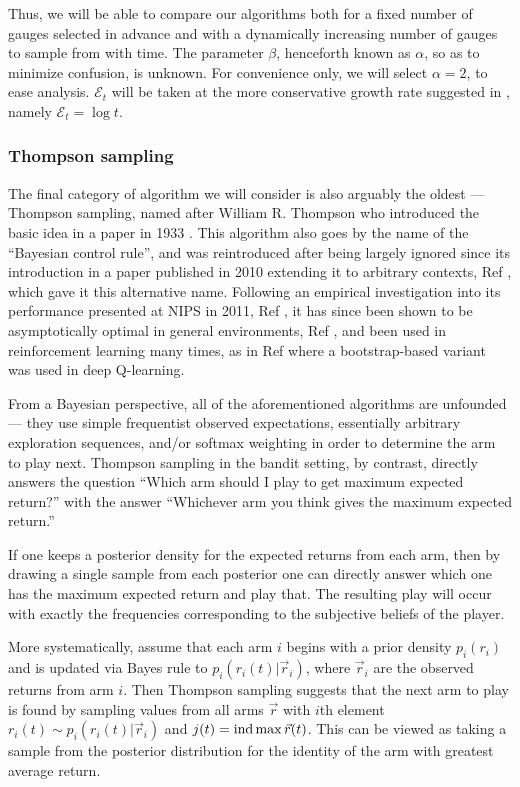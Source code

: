 Thus, we will be able to compare our algorithms both for a fixed number of gauges selected in advance and with a dynamically increasing number of gauges to sample from with time. The parameter $\beta$, henceforth known as $\alpha$, so as to minimize confusion, is unknown. For convenience only, we will select $\alpha=2$, to ease analysis. $\mathcal{E}_t$ will be taken at the more conservative growth rate suggested in \cite{infinitebandits}, namely $\mathcal{E}_t=\log{t}$.

\subsubsection{Thompson sampling}
The final category of algorithm we will consider is also arguably the oldest --- Thompson sampling, named after William R. Thompson who introduced the basic idea in a paper in 1933 \cite{thompson1933}. This algorithm also goes by the name of the ``Bayesian control rule'', and was reintroduced after being largely ignored since its introduction in a paper published in 2010 extending it to arbitrary contexts, Ref \cite{bayesiancontrol}, which gave it this alternative name. Following an empirical investigation into its performance presented at NIPS in 2011, Ref \cite{chapelle2011empirical}, it has since been shown to be asymptotically optimal in general environments, Ref \cite{leike2016thompson}, and been used in reinforcement learning many times, as in Ref \cite{osband2016deep} where a bootstrap-based variant was used in deep Q-learning.

From a Bayesian perspective, all of the aforementioned algorithms are unfounded --- they use simple frequentist observed expectations, essentially arbitrary exploration sequences, and/or softmax weighting in order to determine the arm to play next. Thompson sampling in the bandit setting, by contrast, directly answers the question ``Which arm should I play to get maximum expected return?'' with the answer ``Whichever arm you think gives the maximum expected return.''

If one keeps a posterior density for the expected returns from each arm, then by drawing a single sample from each posterior one can directly answer which one has the maximum expected return and play that. The resulting play will occur with exactly the frequencies corresponding to the subjective beliefs of the player.

More systematically, assume that each arm $i$ begins with a prior density $p_i(r_i)$ and is updated via Bayes rule to $p_i(r_i(t)|\vec{r}_i)$, where $\vec{r}_i$ are the observed returns from arm $i$. Then Thompson sampling suggests that the next arm to play is found by sampling values from all arms $\vec{r}$ with $i$th element $r_i(t)\sim p_i(r_i(t)|\vec{r}_i)$ and $j(t)=\textnormal{ind} \max \vec{r}(t)$. This can be viewed as taking a sample from the posterior distribution for the identity of the arm with greatest average return.

